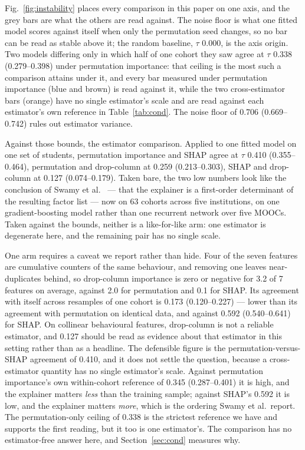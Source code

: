 \documentclass[conference]{IEEEtran}
\begin{document}
Fig.~\ref{fig:instability} places every comparison in this paper on one axis, and the grey bars are what the others are read against. The noise floor is what one fitted model scores against itself when only the permutation seed changes, so no bar can be read as stable above it; the random baseline, $\tau$ 0.000, is the axis origin. Two models differing only in which half of one cohort they saw agree at $\tau$ 0.338 (0.279--0.398) under permutation importance: that ceiling is the most such a comparison attains under it, and every bar measured under permutation importance (blue and brown) is read against it, while the two cross-estimator bars (orange) have no single estimator's scale and are read against each estimator's own reference in Table~\ref{tab:cond}. The noise floor of 0.706 (0.669--0.742) rules out estimator variance.

Against those bounds, the estimator comparison. Applied to one fitted model on
one set of students, permutation importance and SHAP agree at $\tau$ 0.410 (0.355--0.464), permutation and drop-column at 0.259 (0.213--0.303), SHAP and drop-column at 0.127 (0.074--0.179). Taken bare, the two low numbers look like the conclusion of Swamy et al.\ \cite{swamy2022} --- that the explainer is a first-order determinant of the resulting factor list --- now on 63 cohorts across five institutions, on one gradient-boosting model rather than one recurrent network over five MOOCs. Taken against the bounds, neither is a like-for-like arm: one estimator is degenerate here, and the remaining pair has no single scale.

One arm requires a caveat we report rather than hide. Four of the seven features
are cumulative counters of the same behaviour, and removing one leaves
near-duplicates behind, so drop-column importance is zero or negative for 3.2 of 7 features on average, against 2.0 for permutation and 0.1 for SHAP. Its agreement with itself across resamples of one cohort is 0.173 (0.120--0.227) --- lower than its agreement with permutation on identical data, and against 0.592 (0.540--0.641) for SHAP. On collinear behavioural features, drop-column is
not a reliable estimator, and 0.127 should be read as evidence about that estimator in this setting rather than as a headline. The defensible figure is the permutation-versus-SHAP agreement of 0.410, and it does not settle the question, because a cross-estimator quantity has no single estimator's scale. Against permutation importance's own within-cohort reference of 0.345 (0.287--0.401) it is high, and the explainer matters \emph{less} than the training sample; against SHAP's 0.592 it is low, and the explainer matters \emph{more}, which is the ordering Swamy et al.\ report. The permutation-only ceiling of 0.338 is the strictest reference we have and supports the first reading, but it too is one estimator's. The comparison has no estimator-free answer here, and Section~\ref{sec:cond} measures why.
\end{document}
